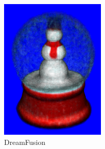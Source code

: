 \begin{figure}[ht]
    \centering
    \small
    \begin{subfigure}[b]{0.23\textwidth}
        \centering
        \includegraphics[width=\textwidth]{etc/a detailed rendering of a snow globe containing a snowman/dreamfusion/dreamfusion_globe_10000_part1.png}
        \vspace{0.1cm}
        \caption{DreamFusion}
    \end{subfigure}
    \begin{subfigure}[b]{0.188\textwidth}
        \centering

\end{subfigure}
\end{figure}
